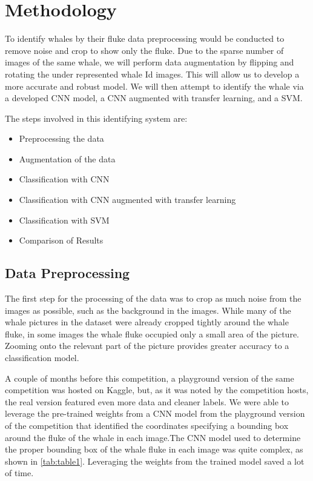 \documentclass[paper=a4, fontsize=11pt]{scrartcl}
\numberwithin{equation}{section}		%
\numberwithin{table}{section}				%
\begin{document}
\section{Methodology}\label{sec: meth}



To identify whales by their fluke data preprocessing would be conducted to remove noise and crop to show only the fluke. Due to the sparse number of images of the same whale, we will perform data augmentation by flipping and rotating the under represented whale Id images. This will allow us to develop a more accurate and robust model. We will then attempt to identify the whale via a developed CNN model, a CNN augmented with transfer learning, and a SVM.

The steps involved in this identifying system are:
\begin{itemize}
    \item Preprocessing the data
    \item Augmentation of the data
    \item Classification with CNN
    \item Classification with CNN augmented with transfer learning
    \item Classification with SVM
    \item Comparison of Results
\end{itemize}

\subsection{Data Preprocessing}\label{subsec:Preprocessing}

The first step for the processing of the data was to crop as much noise from the images as possible, such as the background in the images. While many of the whale pictures in the dataset were already cropped tightly around the whale fluke, in some images the whale fluke occupied only a small area of the picture. Zooming onto the relevant part of the picture provides greater accuracy to a classification model. 

A couple of months before this competition, a playground version of the same competition was hosted on Kaggle, but, as it was noted by the competition hosts, the real version featured even more data and cleaner labels. We were able to leverage the pre-trained weights from a CNN model from the playground version of the competition that identified the coordinates specifying a bounding box around the fluke of the whale in each image.The CNN model used to determine the proper bounding box of the whale fluke in each image was quite complex, as shown in \autoref{tab:table1}. Leveraging the weights from the trained model saved a lot of time.
\end{document}
